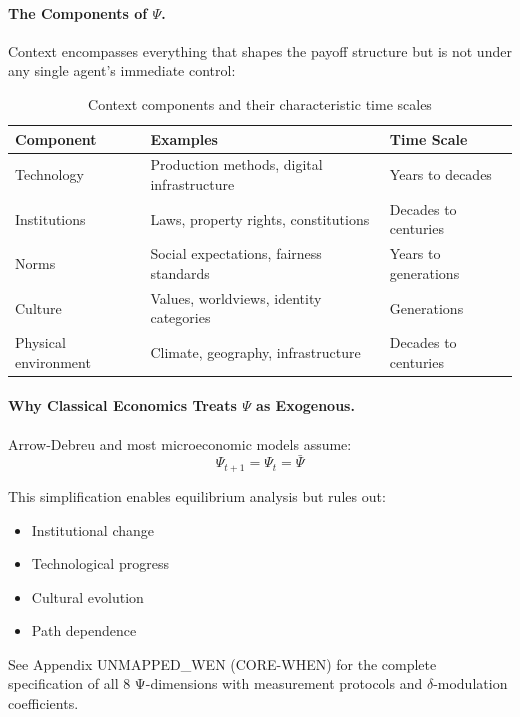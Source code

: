 
\paragraph{The Components of $\Psi$.}
Context encompasses everything that shapes the payoff structure
but is not under any single agent's immediate control:

\begin{table}[h]
\centering
\begin{tabular}{lll}
\toprule
\textbf{Component} & \textbf{Examples} & \textbf{Time Scale} \\
\midrule
Technology & Production methods, digital infrastructure & Years to decades \\
Institutions & Laws, property rights, constitutions & Decades to centuries \\
Norms & Social expectations, fairness standards & Years to generations \\
Culture & Values, worldviews, identity categories & Generations \\
Physical environment & Climate, geography, infrastructure & Decades to centuries \\
\bottomrule
\end{tabular}
\caption{Context components and their characteristic time scales}
\label{tab:context-components}
\end{table}

\paragraph{Why Classical Economics Treats $\Psi$ as Exogenous.}
Arrow-Debreu and most microeconomic models assume:
\begin{equation}
\Psi_{t+1} = \Psi_t = \bar{\Psi}
\label{eq:exogenous-assumption}
\end{equation}

This simplification enables equilibrium analysis but rules out:
\begin{itemize}[nosep]
  \item Institutional change
  \item Technological progress
  \item Cultural evolution
  \item Path dependence
\end{itemize}

\begin{cross-reference}
See Appendix UNMAPPED_WEN (CORE-WHEN) for the complete specification of all 8 Ψ-dimensions
with measurement protocols and $\delta$-modulation coefficients.
\end{cross-reference}


